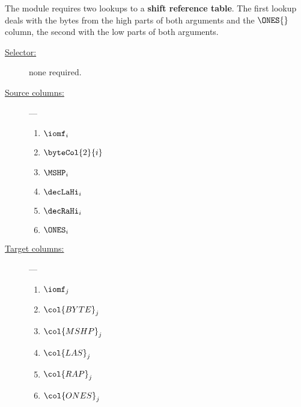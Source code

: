 The \shfMod{} module requires two lookups to a \textbf{shift reference table}. The first lookup deals with the bytes from the high parts of both arguments and the $\ONES{}$ column, the second with the low parts of both arguments.


\begin{description}
	\item[\underline{Selector:}] none required.
	\item[\underline{Source columns:}] ---
	\begin{multicols}{2}
		\begin{enumerate}
			\item $\iomf_{i}$
			\item $\byteCol{2}{i}$
			\item $\MSHP_{i}$
			\item $\decLaHi_{i}$
			\item $\decRaHi_{i}$
			\item $\ONES_{i}$
		\end{enumerate}
	\end{multicols}
	\item[\underline{Target columns:}] ---
	\begin{multicols}{2}
		\begin{enumerate}
			\item $\iomf_{j}$
			\item $\col{BYTE}_{j}$
			\item $\col{MSHP}_{j}$
			\item $\col{LAS}_{j}$
			\item $\col{RAP}_{j}$
			\item $\col{ONES}_{j}$
		\end{enumerate}
	\end{multicols}
\end{description}

